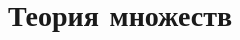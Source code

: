\section{Теория множеств}

\begin{comment}
\subsection{О приближениях}

    Математический анализ "--- это наука о приближениях.

    \begin{definition}
        Определение производной по Коши:
        Пусть $f = f(x)$ -- функция, число $A$ называется производной функции $f$ в
        точке $x$, если при неограниченным уменьшении $|h|$ \[
        P(\varepsilon, \delta) :=   0 < |h| < \delta \longrightarrow \left(\frac{f(x + h) - f(x)}{h} - A\right) < \varepsilon,
        \text{ где } P(x) = \text{истина или ложь} \]
        \[\forall \varepsilon > 0 \
        \exists \delta > 0 \ P(\varepsilon, \delta)
        \]
    \end{definition}
    \begin{example}
        $f(x) = x^2$:
        \begin{equation*}
            \frac{f(x + h) - f(x)}{h} = \frac{x^2 + 2xh + h^2 - x^2}{h} = 2x + h 
        \end{equation*}
        Проверим, что $A  = 2x$ является производной $f$ в точке $x$:
        \begin{equation*}
            \forall \varepsilon \ \exists \delta > 0 \ (0 < |h| < \delta) \rightarrow \left|\frac{(f(x + h )
            - f(x))}{h} - 2x\right| < \varepsilon
        \end{equation*}
        Дано $\varepsilon > 0$. Какое $\delta$ взять, чтобы $P(\varepsilon, \delta) = 1$?
        Если взять $\delta = \dfrac{\varepsilon}{2}$, то $0 < |h| < \delta \longleftrightarrow  |h|\hm{<} \dfrac{\varepsilon}{2}
        \longrightarrow P(\varepsilon, \delta) = 1$
    \end{example}
    \begin{exercise}
        Проверить, что утверждения имеют одинаковые значения: (кто не с нами, тот 
        против нас) $\longleftrightarrow$ (кто не против нас, тот с нами)
    \end{exercise}
    В этом семестре:
    \begin{enumerate}
        \item приближение функций многочленами
        \item евклидова топология вещественной прямой
        \item приложения к исследованию функций
    \end{enumerate}
\end{comment}

